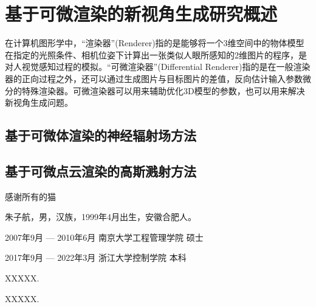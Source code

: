 \documentclass[master,oneside,winfonts]{njuthesis/njuthesis}
\begin{document}
\section{基于可微渲染的新视角生成研究概述}
在计算机图形学中，“渲染器”(Renderer)指的是能够将一个3维空间中的物体模型在指定的光照条件、相机位姿下计算出一张类似人眼所感知的2维图片的程序，是对人视觉感知过程的模拟。“可微渲染器”(Differential Renderer)指的是在一般渲染器的正向过程之外，还可以通过生成图片与目标图片的差值，反向估计输入参数微分的特殊渲染器。可微渲染器可以用来辅助优化3D模型的参数，也可以用来解决新视角生成问题。

\subsection{基于可微体渲染的神经辐射场方法}


\subsection{基于可微点云渲染的高斯溅射方法}



\backmatter 

\begin{acknowledgement}
    感谢所有的猫
\end{acknowledgement}

\begin{spacing}{0.2}
    
\end{spacing}

\begin{resume}
    \begin{authorinfo}
        \noindent 朱子航，男，汉族，1999年4月出生，安徽合肥人。
    \end{authorinfo}
    \begin{education}
    \item[2007年9月 --- 2010年6月] 南京大学工程管理学院 \hfill 硕士
    \item[2017年9月 --- 2022年3月] 浙江大学控制学院 \hfill 本科
    \end{education}
    \begin{publications}
        \item XXXXX.
        \item XXXXX.
    \end{publications}
\end{resume}
\end{document}
